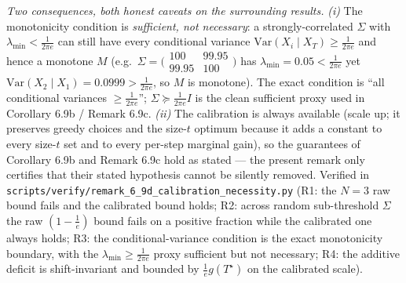 \documentclass[
]{article}
\begin{document}
\emph{Two consequences, both honest caveats on the surrounding results.}
\emph{(i)} The monotonicity condition is \emph{sufficient, not necessary}: a
strongly-correlated $\Sigma$ with $\lambda_{\min}<\tfrac1{2\pi e}$ can still
have every conditional variance $\mathrm{Var}(X_i\mid X_T)\ge\tfrac1{2\pi e}$
and hence a monotone $M$ (e.g.\ $\Sigma=\bigl(\begin{smallmatrix}100&99.95\\
99.95&100\end{smallmatrix}\bigr)$ has $\lambda_{\min}=0.05<\tfrac1{2\pi e}$ yet
$\mathrm{Var}(X_2\mid X_1)=0.0999>\tfrac1{2\pi e}$, so $M$ is monotone). The
exact condition is ``all conditional variances $\ge\tfrac1{2\pi e}$'';
$\Sigma\succeq\tfrac1{2\pi e}I$ is the clean sufficient proxy used in
Corollary 6.9b / Remark 6.9c. \emph{(ii)} The calibration is always available
(scale up; it preserves greedy choices and the size-$t$ optimum because it adds
a constant to every size-$t$ set and to every per-step marginal gain), so the
guarantees of Corollary 6.9b and Remark 6.9c hold as stated --- the present
remark only certifies that their stated hypothesis cannot be silently removed.
Verified in
\texttt{scripts/verify/remark\_6\_9d\_calibration\_necessity.py} (R1: the
$N=3$ raw bound fails and the calibrated bound holds; R2: across random
sub-threshold $\Sigma$ the raw $(1-\tfrac1e)$ bound fails on a positive
fraction while the calibrated one always holds; R3: the conditional-variance
condition is the exact monotonicity boundary, with the $\lambda_{\min}\ge
\tfrac1{2\pi e}$ proxy sufficient but not necessary; R4: the additive deficit
is shift-invariant and bounded by $\tfrac1e g(T^\star)$ on the calibrated
scale).
\end{document}
